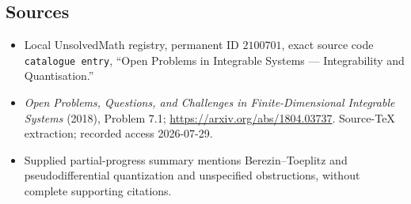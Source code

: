 \documentclass[11pt]{article}
\begin{document}
\subsection{Sources}
\begin{itemize}
\item Local UnsolvedMath registry, permanent ID \(2100701\), exact source code \texttt{catalogue entry}, ``Open Problems in Integrable Systems --- Integrability and Quantisation.''
\item \emph{Open Problems, Questions, and Challenges in Finite-Dimensional Integrable Systems} (2018), Problem 7.1; \url{https://arxiv.org/abs/1804.03737}. Source-TeX extraction; recorded access 2026-07-29.
\item Supplied partial-progress summary mentions Berezin--Toeplitz and pseudodifferential quantization and unspecified obstructions, without complete supporting citations.
\end{itemize}
\end{document}
